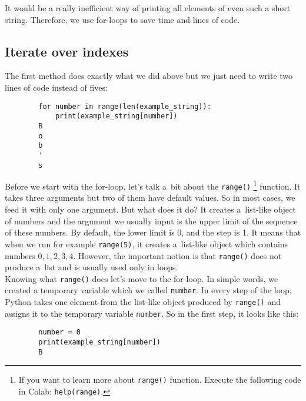 \documentclass{article}
\begin{document}
\noindent It would be a really inefficient way of printing all elements of even such a short string. Therefore, we use for-loops to save time and lines of code.

\subsection*{Iterate over indexes}
The first method does exactly what we did above but we just need to write two lines of code instead of fives:
\begin{center}
    \begin{verbatim}
        for number in range(len(example_string)):
            print(example_string[number])
        B
        o
        b
        '
        s
    \end{verbatim}
\end{center}

\noindent Before we start with the for-loop, let's talk a~bit about the \texttt{range()} \footnote{If you want to learn more about \texttt{range()} function. Execute the following code in Colab: \texttt{help(range)}.} function. It takes three arguments but two of them have default values. So in most cases, we feed it with only one argument. But what does it do? It creates a~list-like object of numbers and the argument we usually input is the upper limit of the sequence of these numbers. By default, the lower limit is 0, and the step is 1. It means that when we run for example \texttt{range(5)}, it creates a~list-like object which contains numbers $0, 1, 2, 3, 4$. However, the important notion is that \texttt{range()} does not produce a~list and is usually used only in loops.\\

\noindent Knowing what \texttt{range()} does let's move to the for-loop. In simple words, we created a temporary variable which we called \texttt{number}. In every step of the loop, Python takes one element from the list-like object produced by \texttt{range()} and assigns it to the temporary variable \texttt{number}. So in the first step, it looks like this:

\begin{center}
    \begin{verbatim}
        number = 0
        print(example_string[number])
        B
    \end{verbatim}
\end{center}
\end{document}
